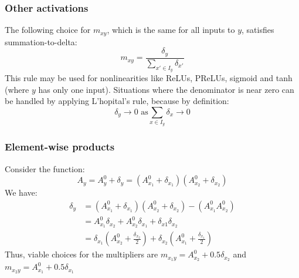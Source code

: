 \documentclass{article}
\begin{document}
\subsubsection{Other activations}
The following choice for $m_{xy}$, which is the same for all inputs to $y$, satisfies summation-to-delta:\\
\begin{equation}
m_{xy} = \frac{\delta_{y}}{\sum_{x' \in I_y} \delta_{x'}}
\end{equation}
This rule may be used for nonlinearities like ReLUs, PReLUs, sigmoid and tanh (where $y$ has only one input). Situations where the denominator is near zero can be handled by applying L'hopital's rule, because by definition:
\begin{equation}
\delta_{y} \rightarrow 0 \text{ as} \sum_{x \in I_y} \delta_{x} \rightarrow 0
\end{equation}

\subsubsection{Element-wise products}
Consider the function:
\begin{equation}
A_y = A_y^0 + \delta_y = (A_{x_1}^0 + \delta_{x_1}) (A_{x_2}^0 + \delta_{x_2})
\end{equation}
We have:\\
\begin{equation}
\begin{aligned}
\delta_y &= (A_{x_1}^0 + \delta_{x_1})(A_{x_2}^0 + \delta_{x_2}) - (A_{x_1}^0A_{x_2}^0)\\
         &= A_{x_1}^0\delta_{x_2} + A_{x_2}^0\delta_{x_1} + \delta_{x1}\delta_{x_2}\\
         &= \delta_{x_1}\left(A_{x_2}^0 + \frac{\delta_{x_2}}{2}\right) + \delta_{x_2}\left(A_{x_1}^0 + \frac{\delta_{x_1}}{2}\right)
\end{aligned}
\end{equation}
Thus, viable choices for the multipliers are $m_{x_1 y} = A_{x_2}^0 + 0.5\delta_{x_2}$ and $m_{x_2 y} = A_{x_1}^0 + 0.5\delta_{x_1}$

\end{document}
